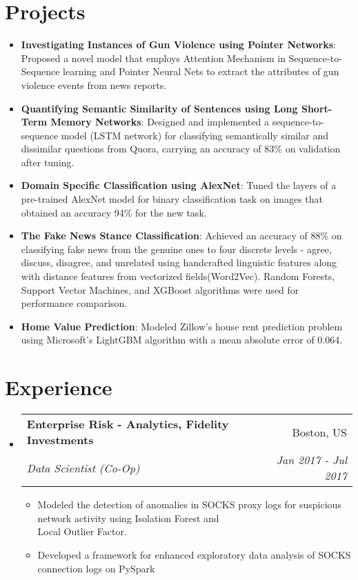 \documentclass[letterpaper,10pt]{article}
\makeatletter
\newcommand{\resumeItem}[2]{
  \item\small{
    \textbf{#1}{: #2 \vspace{-2pt}}
  }
}
\newcommand{\resumeBullet}[2]{
  \item\small{
    \textbf{#1}{#2 \vspace{-2pt}}
  }
}
\newcommand{\resumeSubheading}[4]{
  \vspace{-1pt}\item
    \begin{tabular*}{0.97\textwidth}{l@{\extracolsep{\fill}}r}
      \textbf{#1} & #2 \\
      \textit{\small#3} & \textit{\small #4} \\
    \end{tabular*}\vspace{-5pt}
}
\newcommand{\resumeSubItem}[2]{\resumeItem{#1}{#2}\vspace{-4pt}}
\newcommand{\resumeJobFunc}[2]{\resumeBullet{#1}{#2}\vspace{-0pt}}
\newcommand{\resumeSubHeadingListStart}{\begin{itemize}[leftmargin=*]}
\newcommand{\resumeSubHeadingListEnd}{\end{itemize}}
\newcommand{\resumeItemListStart}{\begin{itemize}}
\newcommand{\resumeItemListEnd}{\end{itemize}\vspace{-5pt}}
\makeatother
\begin{document}
\section{Projects}
  \resumeSubHeadingListStart
    \resumeSubItem{Investigating Instances of Gun Violence using Pointer Networks}
      {Proposed a novel model that employs Attention Mechanism in Sequence-to-Sequence learning and Pointer Neural Nets to extract the attributes of gun violence events from news reports.}
    \resumeSubItem{Quantifying Semantic Similarity of Sentences using Long Short-Term Memory Networks}
      {Designed and implemented a sequence-to-sequence model (LSTM network) for classifying semantically similar and dissimilar questions from Quora, carrying an accuracy of 83\% on validation after tuning.}
    \resumeSubItem{Domain Specific Classification using AlexNet}
      {Tuned the layers of a pre-trained AlexNet model for binary classification task on images that obtained an accuracy 94\% for the new task.}
    \resumeSubItem{The Fake News Stance Classification}
    {Achieved an accuracy of 88\% on classifying fake news from the genuine ones to four discrete levels - agree, discuss, disagree, and unrelated using handcrafted linguistic features along with distance features from vectorized fields(Word2Vec). Random Forests, Support Vector Machines, and XGBoost algorithms were used for performance comparison.}
    \resumeSubItem{Home Value Prediction}
    {Modeled Zillow's house rent prediction problem using Microsoft's LightGBM algorithm with a mean absolute error of 0.064.}

  \resumeSubHeadingListEnd
      
  

\section{Experience}

\resumeSubHeadingListStart
    \resumeSubheading
      {Enterprise Risk - Analytics, Fidelity Investments}{Boston, US}
      {Data Scientist (Co-Op)}{Jan 2017 - Jul 2017}
      \resumeItemListStart
      \resumeJobFunc{}{Modeled the detection of anomalies in SOCKS proxy logs for suspicious network activity using Isolation Forest and \\Local Outlier Factor.}
      \resumeJobFunc{}{Developed a framework for enhanced exploratory data analysis of SOCKS connection logs on PySpark}
      \resumeItemListEnd
      \resumeSubHeadingListEnd
      
\end{document}
